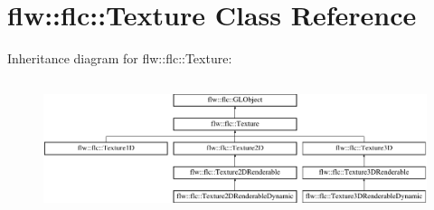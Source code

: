 \hypertarget{classflw_1_1flc_1_1Texture}{}\section{flw\+:\+:flc\+:\+:Texture Class Reference}
\label{classflw_1_1flc_1_1Texture}
Inheritance diagram for flw\+:\+:flc\+:\+:Texture\+:\begin{figure}[H]
\begin{center}
\leavevmode
\includegraphics[height=3.988604cm]{classflw_1_1flc_1_1Texture}
\end{center}
\end{figure}
